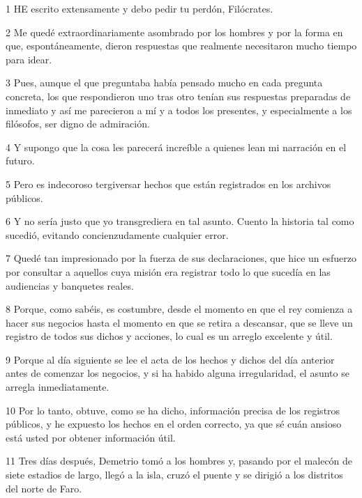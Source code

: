 \par 1 HE escrito extensamente y debo pedir tu perdón, Filócrates.

\par 2 Me quedé extraordinariamente asombrado por los hombres y por la forma en que, espontáneamente, dieron respuestas que realmente necesitaron mucho tiempo para idear.

\par 3 Pues, aunque el que preguntaba había pensado mucho en cada pregunta concreta, los que respondieron uno tras otro tenían sus respuestas preparadas de inmediato y así me parecieron a mí y a todos los presentes, y especialmente a los filósofos, ser digno de admiración.

\par 4 Y supongo que la cosa les parecerá increíble a quienes lean mi narración en el futuro.

\par 5 Pero es indecoroso tergiversar hechos que están registrados en los archivos públicos.

\par 6 Y no sería justo que yo transgrediera en tal asunto. Cuento la historia tal como sucedió, evitando concienzudamente cualquier error.

\par 7 Quedé tan impresionado por la fuerza de sus declaraciones, que hice un esfuerzo por consultar a aquellos cuya misión era registrar todo lo que sucedía en las audiencias y banquetes reales.

\par 8 Porque, como sabéis, es costumbre, desde el momento en que el rey comienza a hacer sus negocios hasta el momento en que se retira a descansar, que se lleve un registro de todos sus dichos y acciones, lo cual es un arreglo excelente y útil.

\par 9 Porque al día siguiente se lee el acta de los hechos y dichos del día anterior antes de comenzar los negocios, y si ha habido alguna irregularidad, el asunto se arregla inmediatamente.

\par 10 Por lo tanto, obtuve, como se ha dicho, información precisa de los registros públicos, y he expuesto los hechos en el orden correcto, ya que sé cuán ansioso está usted por obtener información útil.

\par 11 Tres días después, Demetrio tomó a los hombres y, pasando por el malecón de siete estadios de largo, llegó a la isla, cruzó el puente y se dirigió a los distritos del norte de Faro.

